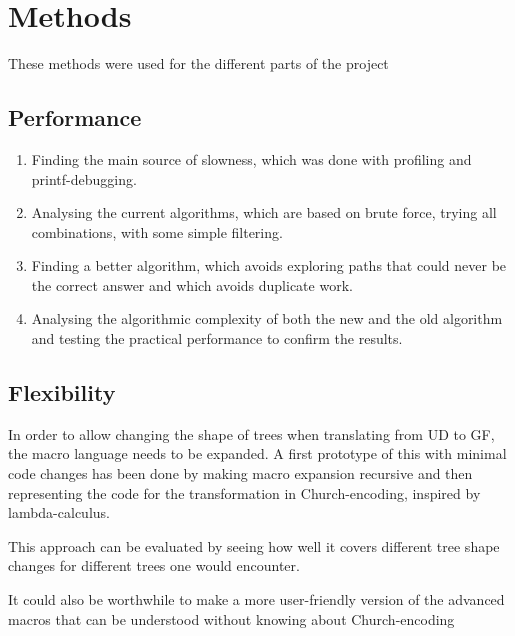 \chapter{Methods}



These methods were used for the different parts of the project

\section{Performance}

\begin{enumerate}
    \item 
Finding the main source of slowness, which was done with profiling and printf-debugging.
    \item 
Analysing the current algorithms, which are based on brute force, trying all combinations, with some simple filtering.
    \item 
Finding a better algorithm, which avoids exploring paths that could never be the correct answer and which avoids duplicate work.
    \item 
Analysing the algorithmic complexity of both the new and the old algorithm and testing the practical performance to confirm the results.
\end{enumerate}

\section{Flexibility}

In order to allow changing the shape of trees when translating from UD to GF, the macro language needs to be expanded.
A first prototype of this with minimal code changes has been done by making macro expansion recursive and then representing the code for the transformation in Church-encoding, inspired by lambda-calculus.

This approach can be evaluated by seeing how well it covers different tree shape changes for different trees one would encounter.

It could also be worthwhile to make a more user-friendly version of the advanced macros that can be understood without knowing about Church-encoding

